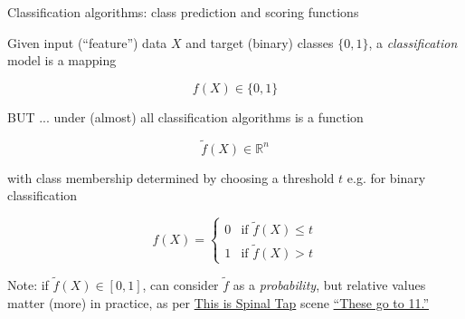 \begin{frame}{Classification algorithms: class prediction and scoring functions}

  Given input (``feature'') data $X$ and target (binary) classes $\{0, 1\}$, a \emph{classification} model is a mapping

  \begin{equation*}
    f(X) \in \{0, 1\}
  \end{equation*}

  BUT ... under (almost) all classification algorithms is a function

  \begin{equation*}
    \tilde{f}(X) \in \mathbb{R}^n
  \end{equation*}

  with class membership determined by choosing a threshold $t$ e.g. for binary classification

  \[
 f(X) =
  \begin{cases}
   0 & \text{if } \tilde{f}(X) \leq t \\
   1 & \text{if } \tilde{f}(X) > t
  \end{cases}
\]

Note: if $\tilde{f}(X) \in [0, 1]$, can consider $\tilde{f}$ as a \emph{probability}, but relative values matter (more) in practice, as per \href{https://www.imdb.com/title/tt0088258/}{This is Spinal Tap} scene \href{https://www.youtube.com/watch?v=4xgx4k83zzc}{``These go to 11.''}
\end{frame}

